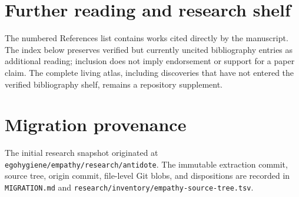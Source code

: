 
\section{Further reading and research shelf}
\label{app:research-shelf}

The numbered References list contains works cited directly by the manuscript.
The index below preserves verified but currently uncited bibliography entries
as additional reading; inclusion does not imply endorsement or support for a
paper claim. The complete living atlas, including discoveries that have not
entered the verified bibliography shelf, remains a repository supplement.



\section{Migration provenance}
\label{app:migration-provenance}

The initial research snapshot originated at
\texttt{egohygiene/empathy/research/antidote}. The immutable extraction commit,
source tree, origin commit, file-level Git blobs, and dispositions are recorded
in \texttt{MIGRATION.md} and
\texttt{research/inventory/empathy-source-tree.tsv}.
